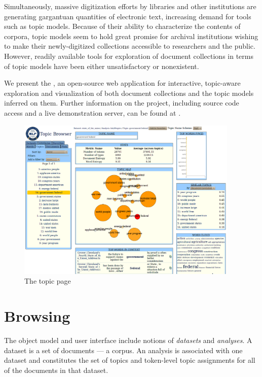 \documentclass[11pt]{article}
\begin{document}
Simultaneously, massive digitization efforts by libraries and other institutions
are generating gargantuan quantities of electronic text, increasing demand for tools such as
topic models. Because of their ability to characterize the contents of
corpora, topic models seem to hold great promise for archival
institutions wishing to make their newly-digitized collections accessible to
researchers and the public. However, readily available tools for exploration of 
document collections in terms of topic models have been either unsatisfactory
or nonexistent.

We present the \toolname{}, an open-source web application for interactive,
topic-aware exploration and visualization of both document collections and the
topic models inferred on them. Further information on the project, including
source code access and a live demonstration server, can be found
at \texttt{\projecturl{}}.

\begin{figure}[t]
 \centering
 \includegraphics[width=400px,keepaspectratio=true]{./topic_page_take2.png}
 \caption{The topic page}
 \label{fig:topic_page}
\end{figure}


\section{Browsing}
The \toolname{} object model and user interface include notions of
\textit{datasets} and \textit{analyses}.
A dataset is a set of documents --- a corpus. An analysis is associated with one
dataset and constitutes the set of topics and token-level topic assignments for
all of the documents in that dataset.
\end{document}
